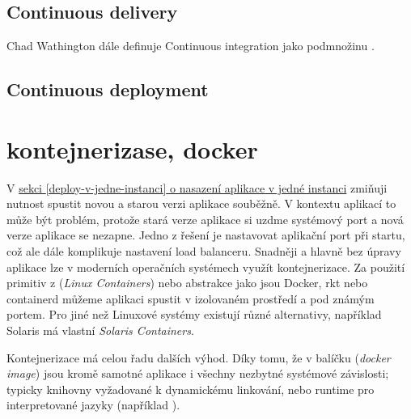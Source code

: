         \subsection{Continuous delivery}
            Chad Wathington dále definuje Continuous integration jako podmnožinu \CD \cite{fowler-go}.
            \blind[2]

        \subsection{Continuous deployment}
            \blind[2]

    \section{kontejnerizase, docker}
        V \hyperref[deploy-v-jedne-instanci]{sekci \ref*{deploy-v-jedne-instanci} o nasazení aplikace v jedné instanci} zmiňuji nutnost spustit novou a starou verzi aplikace souběžně. V kontextu \HTTP aplikací to může být problém, protože stará verze aplikace si uzdme systémový port a nová verze aplikace se nezapne. Jedno z řešení je nastavovat aplikační port při startu, což ale dále komplikuje nastavení load balanceru. Snadněji a hlavně bez úpravy aplikace lze v moderních operačních systémech využít kontejnerizace. Za použití primitiv z  (\textit{Linux Containers}) nebo abstrakce jako jsou Docker, rkt nebo containerd můžeme aplikaci spustit v izolovaném prostředí a pod známým portem. Pro jiné než Linuxové systémy existují různé alternativy, například Solaris má vlastní \textit{Solaris Containers}.

        Kontejnerizace má celou řadu dalších výhod. Díky tomu, že v balíčku (\textit{docker image}) jsou kromě samotné aplikace i všechny nezbytné systémové závislosti; typicky knihovny vyžadované k dynamickému linkování, nebo runtime pro interpretované jazyky (například ).

        \blind[2]
